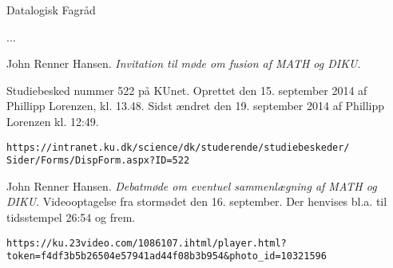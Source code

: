 \documentclass[a4paper]{article}
\begin{document}

\begin{flushright}

\footnotesize\sffamily\itshape

Datalogisk Fagråd

...



\end{flushright}

\begin{thebibliography}{9} %



John Renner Hansen. \emph{Invitation til møde om fusion af MATH og DIKU}.

Studiebesked nummer 522 på KUnet. Oprettet den 15. september 2014 af Phillipp
Lorenzen, kl. 13.48. Sidst ændret den 19. september 2014 af Phillipp Lorenzen
kl. 12:49.

\begin{lstlisting}
https://intranet.ku.dk/science/dk/studerende/studiebeskeder/
Sider/Forms/DispForm.aspx?ID=522
\end{lstlisting}



John Renner Hansen. \emph{Debatmøde om eventuel sammenlægning af MATH og DIKU}.
Videooptagelse fra stormødet den 16. september. Der henvises bl.a. til
tidsstempel 26:54 og frem.

\begin{lstlisting}
https://ku.23video.com/1086107.ihtml/player.html?
token=f4df3b5b26504e57941ad44f08b3b954&photo_id=10321596
\end{lstlisting}

\end{thebibliography}
\end{document}
